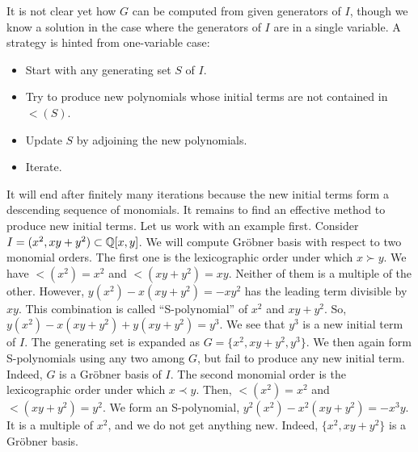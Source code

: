 It is not clear yet how $G$ can be computed from given generators of $I$,
though we know a solution in the case where the generators of $I$ are in a single variable.
A strategy is hinted from one-variable case:
\begin{itemize}
\item[(1)] Start with any generating set $S$ of $I$. 
\item[(2)] Try to produce new polynomials whose initial terms are not contained in $\lt(S)$.
\item[(3)] Update $S$ by adjoining the new polynomials.
\item[(4)] Iterate.
\end{itemize}
It will end after finitely many iterations because the new initial terms form a descending sequence of monomials.
It remains to find an effective method to produce new initial terms.
Let us work with an example first.
Consider $I = (x^2,xy+y^2) \subset \mathbb{Q}[x,y]$.
We will compute Gr\"obner basis with respect to two monomial orders.
The first one is the lexicographic order under which $x \succ y$.
We have $\lt(x^2) = x^2$ and $\lt(xy+y^2) = xy$.
Neither of them is a multiple of the other.
However, $y(x^2) - x(xy+y^2) = -xy^2$ has the leading term divisible by $xy$.
This combination is called ``S-polynomial'' of $x^2$ and $xy+y^2$.
So, $y(x^2) - x(xy+y^2) + y(xy+y^2) = y^3$.
We see that $y^3$ is a new initial term of $I$.
The generating set is expanded as $G = \{ x^2, xy + y^2, y^3 \}$.
We then again form S-polynomials using any two among $G$,
but fail to produce any new initial term. Indeed, $G$ is a Gr\"obner basis of $I$.
The second monomial order is the lexicographic order under which $x \prec y$.
Then, $\lt(x^2) = x^2$ and $\lt(xy+y^2) = y^2$.
We form an S-polynomial, $y^2(x^2)-x^2(xy+y^2) = -x^3 y$.
It is a multiple of $x^2$, and we do not get anything new.
Indeed, $\{x^2, xy+y^2\}$ is a Gr\"obner basis.

